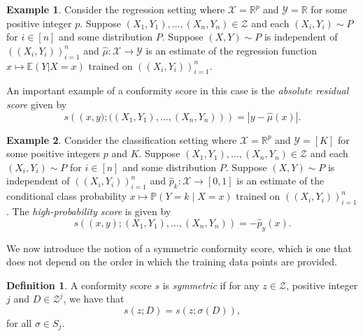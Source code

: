 \documentclass[11pt, titlepage]{article} %
\newcommand{\Prob}[1]{\mathbb{P}\left( #1 \right)}
\newcommand{\Exp}[3]{\mathbb{E}\left#2 #1 \right#3}
\numberwithin{equation}{section}
\theoremstyle{definition}
\newtheorem{definition}{Definition}
\newtheorem{example}{Example}
\numberwithin{theorem}{section}
\numberwithin{lemma}{section}
\numberwithin{corollary}{section}
\numberwithin{proposition}{section}
\numberwithin{definition}{section}
\numberwithin{remark}{section}
\begin{document}
\begin{example}
\label{example:absolute_residual_score}
    Consider the regression setting where \(\mathcal{X} = \mathbb{R}^p\) and \(\mathcal{Y} = \mathbb{R}\) for some positive integer \(p\). Suppose \((X_1, Y_1), \ldots, (X_n, Y_n) \in \mathcal{Z}\) and each \((X_i, Y_i) \sim P\) for \(i \in [n]\) and some distribution \(P\). Suppose \((X,Y) \sim P\) is independent of \(((X_i, Y_i))_{i=1}^n\) and \(\hat{\mu}: \mathcal{X} \to \mathcal{Y}\) is an estimate of the regression function \(x \mapsto \Exp{Y|X = x}{(}{)}\) trained on \(((X_i, Y_i))_{i=1}^n\). \vskip5pt

    \noindent
    An important example of a conformity score in this case is the \textit{absolute residual score} given by \[s\left(\left(x,y); ((X_1, Y_1), \ldots, (X_n, Y_n)\right)\right) = |y - \hat{\mu}(x)|.\]
\end{example}

\begin{example}
\label{example:max_prob_score}
    Consider the classification setting where \(\mathcal{X} = \mathbb{R}^p\) and \(\mathcal{Y} = [K]\) for some positive integers \(p\) and \(K\). Suppose \((X_1, Y_1), \ldots, (X_n, Y_n) \in \mathcal{Z}\) and each \((X_i, Y_i) \sim P\) for \(i \in [n]\) and some distribution \(P\). Suppose \((X,Y) \sim P\) is independent of \(((X_i, Y_i))_{i=1}^n\) and \(\hat{p}_k: \mathcal{X} \to [0,1]\) is an estimate of the conditional class probability \(x \mapsto \Prob{Y = k \mid X = x}\) trained on \(((X_i, Y_i))_{i=1}^n\). The \textit{high-probability score} \cite{angelopoulos2024theoreticalfoundationsconformalprediction} is given by \[
        s((x,y); (X_1, Y_1), \ldots, (X_n, Y_n)) = -\hat{p}_{y}(x).
    \]

\end{example}

\noindent
We now introduce the notion of a symmetric conformity score, which is one that does not depend on the order in which the training data points are provided.

\begin{definition}
    A conformity score \(s\) is \textit{symmetric} if for any \(z \in \mathcal{Z}\), positive integer \(j\) and \(D \in \mathcal{Z}^j\), we have that \[s(z; D) = s(z; \sigma(D)), \] for all \(\sigma \in S_j\).
\label{defn:symmetric_conformityscore}
\end{definition}
\end{document}
